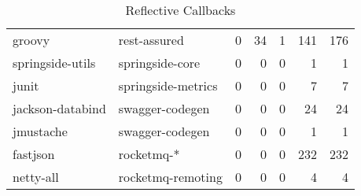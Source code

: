\begin{table}[ht]
\begin{tabular}{ll!{\color{verylightgray}\vrule}rrrr!{\color{verylightgray}\vrule}r}
  groovy & rest-assured & 0 & 34 & 1 & 141 & 176 \\ 
  springside-utils & springside-core & 0 & 0 & 0 & 1 & 1 \\ 
  junit & springside-metrics & 0 & 0 & 0 & 7 & 7 \\ 
  jackson-databind & swagger-codegen & 0 & 0 & 0 & 24 & 24 \\ 
  jmustache & swagger-codegen & 0 & 0 & 0 & 1 & 1 \\ 
  fastjson & rocketmq-* & 0 & 0 & 0 & 232 & 232 \\ 
  netty-all & rocketmq-remoting & 0 & 0 & 0 & 4 & 4 \\ 
\end{tabular}
\caption{\label{tab:refl-callbacks}Reflective Callbacks} 
\end{table}
